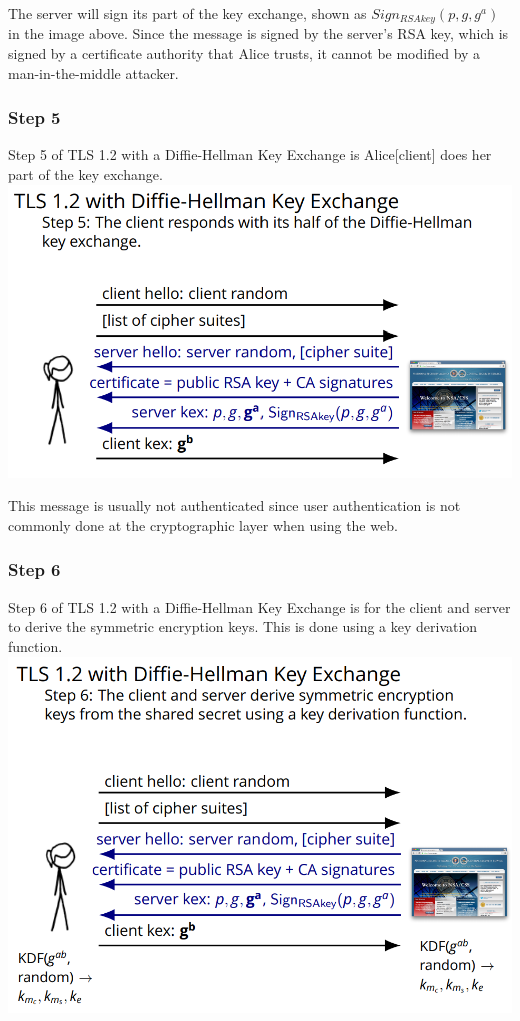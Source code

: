 \documentclass[11pt]{article} %
\begin{document}
 The server will sign its part of the key exchange, shown as 
 $Sign_{RSAkey}(p,g,g^a)$ in the image above. Since the message is signed by 
 the server's RSA key, which is signed by a certificate authority that Alice 
 trusts, it cannot be modified by a man-in-the-middle attacker.

\newpage
\subsubsection{Step 5}
Step 5 of TLS 1.2 with a Diffie-Hellman Key Exchange is Alice[client] does her 
part of the key exchange. \\

\includegraphics[scale=.8]{./DiffieStep5.png}

This message is usually not authenticated since user authentication is not 
commonly done at the cryptographic layer when using the web.

\subsubsection{Step 6}
Step 6 of TLS 1.2 with a Diffie-Hellman Key Exchange is for the client and 
server to derive the symmetric encryption keys. This is done using a key 
derivation function. \\

\includegraphics[scale=.8]{./DiffieStep6.png}
\end{document}
